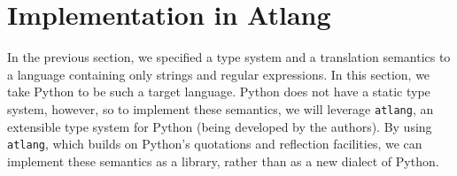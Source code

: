 \documentclass[9pt]{sig-alternate}
\theoremstyle{definition}
\newcommand{\Lagr}{\mathcal{L}}
\newcommand{\lang}[1]{\Lagr\{#1\}}
\newcommand{\rcoerce}[2]{{\sf rcoerce}[#1](#2)}
\newcommand{\stringin}[1]{{\sf stringin}[#1]}
\newcommand{\preplace}[3]{{\sf preplace}(#1;#2;#3)}
\newcommand{\rx}[1]{ {\sf rx}[#1] }
\newcommand{\str}{{\sf string}}
\newcommand{\lsubst}[3]{{\tt lsubst}(#1;#2;#3)} %
\newcommand{\lreplace}[3]{{\tt lreplace}(#1; #2; #3)}
\newcommand{\err}{\ {\sf err}}
\newcommand{\trden}[1]{\llbracket #1 \rrbracket} %
\newcommand{\treduces}{ \Downarrow }
\newcommand{\sreduces}{ \Downarrow }
\begin{document}
%
%
%
%
%
%
%


\section{Implementation in {Atlang}}\label{atlang}
In the previous section, we specified a type system and a translation semantics to a language containing only strings and regular expressions. In this section, we take Python to be such a target language. Python does not have a static type system, however, so to implement these semantics, we will leverage \verb|atlang|, an extensible type system for Python (being developed by the authors). By using \verb|atlang|, which builds on Python's quotations and reflection facilities, we can implement these semantics as a library, rather than as a new dialect of Python. 
\end{document}
